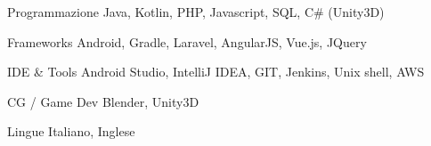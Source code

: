 


\begin{cvskills}


\cvskill
{Programmazione} %
{Java, Kotlin, PHP, Javascript, SQL, C\# (Unity3D)} %


\cvskill
{Frameworks} %
{Android, Gradle, Laravel, AngularJS, Vue.js, JQuery} %


\cvskill
{IDE \& Tools} %
{Android Studio, IntelliJ IDEA, GIT, Jenkins, Unix shell, AWS} %


\cvskill
{CG / Game Dev} %
{Blender, Unity3D} %


\cvskill
{Lingue} %
{Italiano, Inglese} %


\end{cvskills}